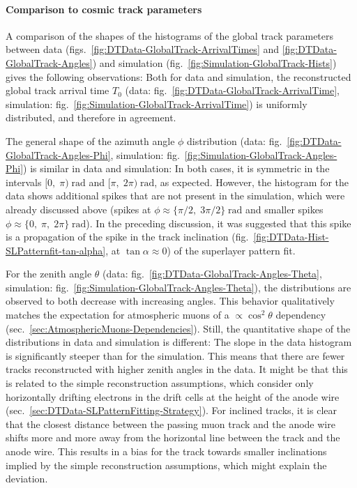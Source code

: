 \paragraph{Comparison to cosmic track parameters}
A comparison of the shapes of the histograms of the global track parameters between data (figs.\ \ref{fig:DTData-GlobalTrack-ArrivalTimes} and \ref{fig:DTData-GlobalTrack-Angles}) and simulation (fig.\ \ref{fig:Simulation-GlobalTrack-Hists}) gives the following observations: Both for data and simulation, the reconstructed global track arrival time $T_0$ (data: fig.\ \ref{fig:DTData-GlobalTrack-ArrivalTime}, simulation: fig.\ \ref{fig:Simulation-GlobalTrack-ArrivalTime}) is uniformly distributed, and therefore in agreement.
\par The general shape of the azimuth angle $\phi$ distribution (data: fig.\ \ref{fig:DTData-GlobalTrack-Angles-Phi}, simulation: fig.\ \ref{fig:Simulation-GlobalTrack-Angles-Phi}) is similar in data and simulation: In both cases, it is symmetric in the intervals $[0,\;\pi)\;\si{\radian}$ and $[\pi,\;2\pi)\;\si{\radian}$, as expected. However, the histogram for the data shows additional spikes that are not present in the simulation, which were already discussed above (spikes at $\phi\approx\{\pi/2,\;3\pi/2\}\;\si{\radian}$ and smaller spikes $\phi\approx\{0,\;\pi,\;2\pi\}\;\si{\radian}$). In the preceding discussion, it was suggested that this spike is a propagation of the spike in the track inclination (fig.\ \ref{fig:DTData-Hist-SLPatternfit-tan-alpha}, at $\tan\alpha\approx 0$) of the superlayer pattern fit.
\par For the zenith angle $\theta$ (data: fig.\ \ref{fig:DTData-GlobalTrack-Angles-Theta}, simulation: fig.\ \ref{fig:Simulation-GlobalTrack-Angles-Theta}), the distributions are observed to both decrease with increasing angles. This behavior qualitatively matches the expectation for atmospheric muons of a $\propto \cos^2\theta$ dependency (sec.\ \ref{sec:AtmosphericMuons-Dependencies}). Still, the quantitative shape of the distributions in data and simulation is different: The slope in the data histogram is significantly steeper than for the simulation. This means that there are fewer tracks reconstructed with higher zenith angles in the data. It might be that this is related to the simple reconstruction assumptions, which consider only horizontally drifting electrons in the drift cells at the height of the anode wire (sec.\ \ref{sec:DTData-SLPatternFitting-Strategy}). For inclined tracks, it is clear that the closest distance between the passing muon track and the anode wire shifts more and more away from the horizontal line between the track and the anode wire. This results in a bias for the track towards smaller inclinations implied by the simple reconstruction assumptions, which might explain the deviation.
